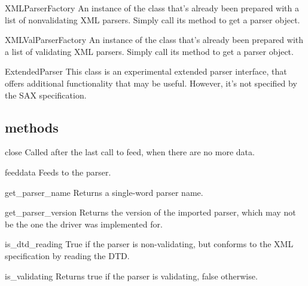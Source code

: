 \documentclass{howto}
\begin{document}
\begin{datadesc}{XMLParserFactory}
An instance of the  class that's already been
prepared with a list of nonvalidating XML parsers.  Simply call its
 method to get a parser object. 
\end{datadesc}

\begin{datadesc}{XMLValParserFactory}
An instance of the  class that's already been
prepared with a list of validating XML parsers.  Simply call its
 method to get a parser object. 
\end{datadesc}

\begin{classdesc}{ExtendedParser}{}
This class is an experimental extended parser interface, that offers
additional functionality that may be useful.  However, it's not
specified by the SAX specification.
\end{classdesc}

\subsection{ methods}

\begin{methoddesc}{close}{}
Called after the last call to feed, when there are no more data.
\end{methoddesc}

\begin{methoddesc}{feed}{data}
Feeds  to the parser.
\end{methoddesc}

\begin{methoddesc}{get_parser_name}{}
Returns a single-word parser name.
\end{methoddesc}

\begin{methoddesc}{get_parser_version}{}
Returns the version of the imported parser, which may not be the
one the driver was implemented for.
\end{methoddesc}

\begin{methoddesc}{is_dtd_reading}{}
True if the parser is non-validating, but conforms to the XML specification by
reading the DTD.
\end{methoddesc}

\begin{methoddesc}{is_validating}{}
Returns true if the parser is validating, false otherwise.
\end{methoddesc}
\end{document}
